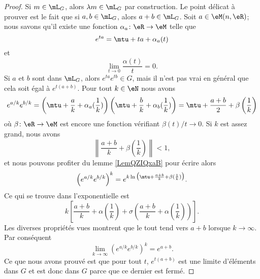 \begin{proof}
    Si \( m\in\mL_G\), alors \( \lambda m\in\mL_G\) par construction. Le point délicat à prouver est le fait que si \( a,b\in \mL_G\), alors \( a+b\in\mL_G\). Soit \( a\in \eM(n,\eR)\); nous savons qu'il existe une fonction \( \alpha_a\colon \eR\to \eM\) telle que
    \begin{equation}
        e^{ta}=\mtu+ta+\alpha_a(t)
    \end{equation}
    et 
    \begin{equation}
        \lim_{t\to 0} \frac{ \alpha(t) }{ t }=0.
    \end{equation}
    Si \( a\) et \( b\) sont dans \( \mL_G\), alors \(  e^{ta} e^{tb}\in G\), mais il n'est pas vrai en général que cela soit égal à \(  e^{t(a+b)}\). Pour tout \( k\in \eN\) nous avons
    \begin{equation}
        e^{a/k} e^{b/k}=\left( \mtu+\frac{ a }{ k }+\alpha_a(\frac{1}{ k }) \right)\left( \mtu+\frac{ b }{ k }+\alpha_b(\frac{1}{ k }) \right)=\mtu+\frac{ a+b }{2}+\beta\left( \frac{1}{ k } \right)
    \end{equation}
   où \( \beta\colon \eR\to \eM\) est encore une fonction vérifiant \( \beta(t)/t\to 0\). Si \( k\) est assez grand, nous avons
   \begin{equation}
       \left\| \frac{ a+b }{ k }+\beta(\frac{1}{ k })  \right\|<1,
   \end{equation}
   et nous pouvons profiter du lemme \ref{LemQZIQxaB} pour écrire alors
   \begin{equation}
       \left(  e^{a/k} e^{b/k} \right)^k= e^{k\ln\big(\mtu+\frac{ a+b }{ k }+\beta(\frac{1}{ k })\big)}.
   \end{equation}
   Ce qui se trouve dans l'exponentielle est
   \begin{equation}
       k\left[ \frac{ a+b }{ k }+\alpha( \frac{1}{ k })+\sigma\left( \frac{ a+b }{ k }+\alpha(\frac{1}{ k }) \right) \right].
   \end{equation}
   Les diverses propriétés vues montrent que le tout tend vers \( a+b\) lorsque \( k\to \infty\). Par conséquent
   \begin{equation}
       \lim_{k\to \infty} \left(  e^{a/k} e^{b/k} \right)^k= e^{a+b}.
   \end{equation}
   Ce que nous avons prouvé est que pour tout \( t\), \(  e^{t(a+b)}\) est une limite d'éléments dans \( G\) et est donc dans \( G\) parce que ce dernier est fermé.
\end{proof}


